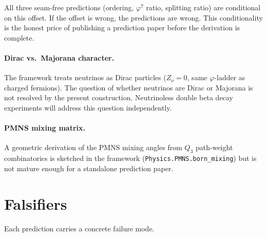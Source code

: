 \documentclass[11pt]{article}
\theoremstyle{remark}
\newcommand{\phig}{\varphi}
\begin{document}
All three seam-free predictions (ordering, $\phig^7$ ratio,
splitting ratio) are conditional on this offset.  If the offset
is wrong, the predictions are wrong.  This conditionality is
the honest price of publishing a prediction paper before the
derivation is complete.

\paragraph{Dirac vs.\ Majorana character.}
The framework treats neutrinos as Dirac particles ($Z_\nu=0$,
same $\phig$-ladder as charged fermions).  The question of
whether neutrinos are Dirac or Majorana is not resolved by the
present construction.  Neutrinoless double beta decay
experiments will address this question independently.

\paragraph{PMNS mixing matrix.}
A geometric derivation of the PMNS mixing angles from $Q_3$
path-weight combinatorics is sketched in the framework
(\texttt{Physics.PMNS.born\_mixing}) but is not mature enough
for a standalone prediction paper.

\section{Falsifiers}
\label{sec:falsifiers}

Each prediction carries a concrete failure mode.
\end{document}
